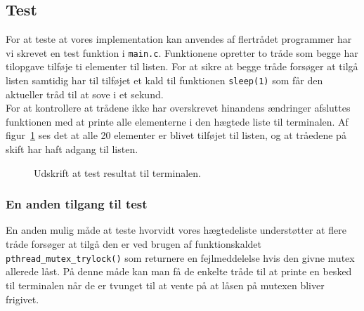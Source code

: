 \documentclass[main.tex]{subfile}
\begin{document}
\subsection{Test}\label{sec:del2_test}
For at teste at vores implementation kan anvendes af flertrådet programmer har vi skrevet en test funktion i \texttt{main.c}. Funktionene opretter to tråde som begge har tilopgave tilføje ti elementer til listen. For at sikre at begge tråde forsøger at tilgå listen samtidig har til tilføjet et kald til funktionen \texttt{sleep(1)} som får den aktueller tråd til at sove i et sekund.\\

For at kontrollere at trådene ikke har overskrevet hinandens ændringer afsluttes funktionen med at printe alle elementerne i den hægtede liste til terminalen. Af figur~\ref{fig:opg2_2_test} ses det at alle 20 elementer er blivet tilføjet til listen, og at tråedene på skift har haft adgang til listen. 

\begin{figure}[H]
\center
{}
\caption{Udskrift at test resultat til terminalen.}
\label{fig:opg2_2_test}
\end{figure}

\subsubsection{En anden tilgang til test}
En anden mulig måde at teste hvorvidt vores hægtedeliste understøtter at flere tråde forsøger at tilgå den er ved brugen af funktionskaldet \texttt{pthread\_mutex\_trylock()} som returnere en fejlmeddelelse hvis den givne mutex allerede låst. På denne måde kan man få de enkelte tråde til at printe en besked til terminalen når de er tvunget til at vente på at låsen på mutexen bliver frigivet. 
\end{document}

